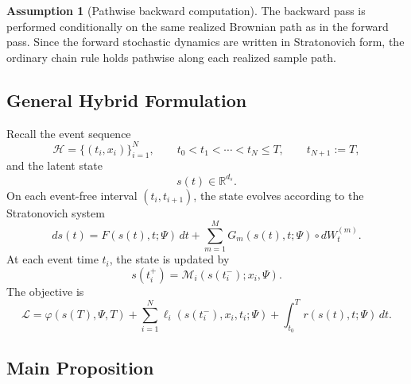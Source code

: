 \documentclass[11pt]{article}
\theoremstyle{definition}
\newtheorem{assumption}{Assumption}
\numberwithin{equation}{section}
\numberwithin{theorem}{section}
\numberwithin{proposition}{section}
\numberwithin{lemma}{section}
\numberwithin{corollary}{section}
\numberwithin{definition}{section}
\numberwithin{remark}{section}
\newcommand{\1}{\mathbbm{1}}
\begin{document}
\begin{assumption}[Pathwise backward computation]
\label{ass:pathwise}
The backward pass is performed conditionally on the same realized Brownian path as in the forward pass. Since the forward stochastic dynamics are written in Stratonovich form, the ordinary chain rule holds pathwise along each realized sample path.
\end{assumption}

\subsection{General Hybrid Formulation}

Recall the event sequence
\[
\mathcal H=\{(t_i,x_i)\}_{i=1}^N,
\qquad
t_0 < t_1 < \cdots < t_N \le T,
\qquad
t_{N+1}:=T,
\]
and the latent state
\[
s(t)\in\mathbb{R}^{d_s}.
\]
On each event-free interval $(t_i,t_{i+1})$, the state evolves according to the Stratonovich system
\begin{equation}
\label{eq:app_forward_hybrid}
ds(t)
=
F(s(t),t;\Psi)\,dt
+
\sum_{m=1}^M G_m(s(t),t;\Psi)\circ dW_t^{(m)}.
\end{equation}
At each event time $t_i$, the state is updated by
\begin{equation}
\label{eq:app_event_map_hybrid}
s(t_i^+)=\mathcal M_i(s(t_i^-);x_i,\Psi).
\end{equation}
The objective is
\begin{equation}
\label{eq:app_objective_general}
\mathcal L
=
\varphi(s(T),\Psi,T)
+
\sum_{i=1}^N \ell_i(s(t_i^-),x_i,t_i;\Psi)
+
\int_{t_0}^T r(s(t),t;\Psi)\,dt.
\end{equation}

\subsection{Main Proposition}
\end{document}
